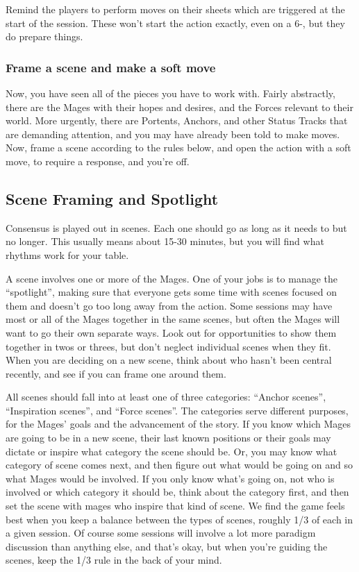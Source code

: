 \documentclass[
  oneside,
  statementpaper,
  9pt]{memoir}
\begin{document}
Remind the players to perform moves on their sheets which are triggered
at the start of the session. These won't start the action exactly, even
on a 6-, but they do prepare things.

\hypertarget{frame-a-scene-and-make-a-soft-move}{%
\subsubsection{Frame a scene and make a soft
move}\label{frame-a-scene-and-make-a-soft-move}}

Now, you have seen all of the pieces you have to work with. Fairly
abstractly, there are the Mages with their hopes and desires, and the
Forces relevant to their world. More urgently, there are Portents,
Anchors, and other Status Tracks that are demanding attention, and you
may have already been told to make moves. Now, frame a scene according
to the rules below, and open the action with a soft move, to require a
response, and you're off.

\hypertarget{scene-framing-and-spotlight}{%
\subsection{Scene Framing and
Spotlight}\label{scene-framing-and-spotlight}}

Consensus is played out in scenes. Each one should go as long as it
needs to but no longer. This usually means about 15-30 minutes, but you
will find what rhythms work for your table.

A scene involves one or more of the Mages. One of your jobs is to manage
the ``spotlight'', making sure that everyone gets some time with scenes
focused on them and doesn't go too long away from the action. Some
sessions may have most or all of the Mages together in the same scenes,
but often the Mages will want to go their own separate ways. Look out
for opportunities to show them together in twos or threes, but don't
neglect individual scenes when they fit. When you are deciding on a new
scene, think about who hasn't been central recently, and see if you can
frame one around them.

All scenes should fall into at least one of three categories: ``Anchor
scenes'', ``Inspiration scenes'', and ``Force scenes''. The categories
serve different purposes, for the Mages' goals and the advancement of
the story. If you know which Mages are going to be in a new scene, their
last known positions or their goals may dictate or inspire what category
the scene should be. Or, you may know what category of scene comes next,
and then figure out what would be going on and so what Mages would be
involved. If you only know what's going on, not who is involved or which
category it should be, think about the category first, and then set the
scene with mages who inspire that kind of scene. We find the game feels
best when you keep a balance between the types of scenes, roughly 1/3 of
each in a given session. Of course some sessions will involve a lot more
paradigm discussion than anything else, and that's okay, but when you're
guiding the scenes, keep the 1/3 rule in the back of your mind.
\end{document}
